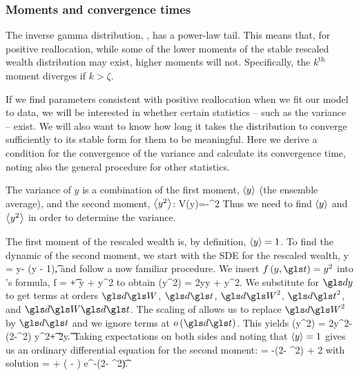 
\subsubsection{Moments and convergence times}
The inverse gamma distribution, , has a power-law tail. This means that, for positive reallocation, while some of the lower moments of the stable rescaled wealth distribution may exist, higher moments will not. Specifically, the $k^\text{th}$ moment diverges if $k>\zeta$. 

If we find parameters consistent with positive reallocation when we fit our model to data, we will be interested in whether certain statistics -- such as the variance -- exist. We will also want to know how long it takes the distribution to converge sufficiently to its stable form for them to be meaningful. Here we derive a condition for the convergence of the variance and calculate its convergence time, noting also the general procedure for other statistics.

The variance of $y$ is a combination of the first moment, $\left\langle y \right\rangle$ (the ensemble average), and the second moment, $\left\langle y^2 \right\rangle$:
\be
V(y)=-^2
\ee
Thus we need to find $\left\langle y \right\rangle$ and $\left\langle y^2 \right\rangle$ in order to determine the variance.

The first moment of the rescaled wealth is, by definition, $\left\langle y \right\rangle=1$. To find the dynamic of the second moment, we start with the SDE for the rescaled wealth,
\be
\gd y = \gsigma y\gd\gW - \gphi\left(y - 1\right)\gd\t,
\ee
and follow a now familiar procedure. We insert $f\left(y,\t\right)=y^2$ into \Ito's formula,
\be
\gd f =  \gd\t +  \gd y +  \gd y^2
\ee
to obtain
\be
\gd \left(y^2\right) = 2y\gd y + \gd y^2.
\ee
We substitute  for $\gd y$ to get terms at orders $\gd\gW$, $\gd\t$, $\gd\gW^2$, $\gd\t^2$, and $\gd\gW\gd\t$. The scaling of \BM allows us to replace $\gd\gW^2$ by $\gd\t$ and we ignore terms at $o\left(\gd\t\right)$. This yields
\bea
\gd \left(y^2\right) = 2\gsigma y^2\gd\gW - \left(2\gphi-\gsigma^2\right) y^2\gd\t + 2\gphi y\gd\t.
\eea
Taking expectations on both sides and noting that $\left\langle y \right\rangle=1$ gives us an ordinary differential equation for the second moment:
\be
{} = -\left(2\gphi - \gsigma^2\right)  + 2\gphi
{}
\ee
with solution
\be
{} =  + \left( - \right) e^{-\left(2\gphi - \gsigma^2\right)\t}.
\ee

